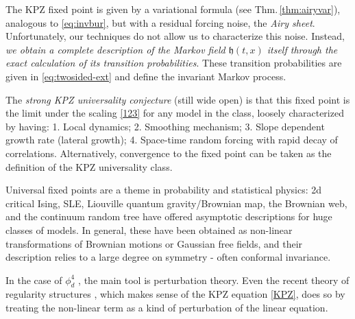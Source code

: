 \documentclass[letterpaper,reqno,11pt,oneside,final]{amsart}
\theoremstyle{definition}
\newcommand{\fh}{\mathfrak{h}}
\numberwithin{equation}{section}
\begin{document}
The KPZ fixed point is given by a variational formula (see Thm.\,\ref{thm:airyvar}), analogous to \eqref{eq:invbur}, but with  a residual forcing noise, the \emph{Airy sheet}.
Unfortunately, our techniques do not allow us to characterize this noise.
Instead, \emph{we obtain a complete description of the Markov field $\fh(t,x)$ itself through the exact calculation of its transition probabilities}.
These transition probabilities are given in \eqref{eq:twosided-ext} and define the invariant Markov process.

The \emph{strong KPZ universality conjecture} (still wide open) is that this fixed point is the limit under the scaling \eqref{123} for any model in the class, loosely characterized by having: 1. Local dynamics; 2.  Smoothing mechanism;  3.  Slope dependent growth rate (lateral growth);  4.  Space-time random forcing with rapid decay of correlations.   Alternatively, convergence to the fixed point can be taken as the  definition of the KPZ universality class.

Universal fixed points are a theme in probability and statistical physics:  2d critical Ising, SLE, Liouville quantum gravity/Brownian map, the Brownian web, and the continuum random tree have offered asymptotic descriptions for huge classes of models.  
In general, these have been obtained as non-linear transformations of Brownian motions or Gaussian free fields, and their description relies to a large degree on symmetry - often conformal invariance. 

In the case of $\phi^4_d$ \cite{simon-Pphi2}, the main tool is perturbation theory.
Even the recent theory of regularity structures \cite{hairerReg}, which makes sense of the KPZ equation \eqref{KPZ}, does so by treating the non-linear term as a kind of perturbation of the linear equation.
\end{document}
